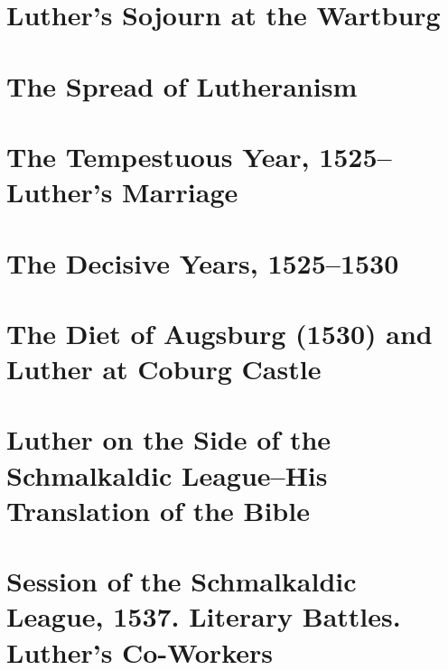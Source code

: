 \chapter{Luther’s Sojourn at the Wartburg}




\chapter{The Spread of Lutheranism}







\chapter{The Tempestuous Year, 1525--Luther’s Marriage}






\chapter{The Decisive Years, 1525--1530}









\chapter{The Diet of Augsburg (1530) and Luther at Coburg Castle}





\chapter{Luther on the Side of the Schmalkaldic League--His Translation of the Bible}





\chapter{Session of the Schmalkaldic League, 1537. Literary Battles. Luther’s Co-Workers}






